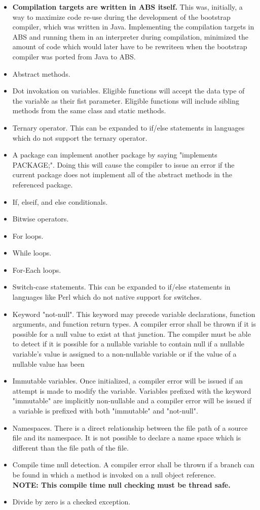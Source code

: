 \documentclass[hidelinks]{article}
\begin{document}
\begin{itemize}
\item \textbf{Compilation targets are written in ABS itself.} This was, initially, a way to maximize code re-use during the development of the bootstrap compiler, which was written in Java. Implementing the compilation targets in ABS and running them in an interpreter during compilation, minimized the amount of code which would later have to be rewriteen when the bootstrap compiler was ported from Java to ABS.
\item Abstract methods.
\item Dot invokation on variables. Eligible functions will accept the data type of the variable as their fist parameter. Eligible functions will include sibling methods from the same class and static methods.
\item Ternary operator. This can be expanded to if/else statements in languages which do not support the ternary operator.
\item A package can implement another package by saying "implements PACKAGE;". Doing this will cause the compiler to issue an error if the current package does not implement all of the abstract methods in the referenced package.
\item If, elseif, and else conditionals.
\item Bitwise operators.
\item For loops.
\item While loops.
\item For-Each loops.
\item Switch-case statements. This can be expanded to if/else statements in languages like Perl which do not native support for switches.
\item Keyword "not-null". This keyword may precede variable declarations, function
   arguments, and function return types. A compiler error shall be thrown if it
   is possible for a null value to exist at that junction. The compiler must be
   able to detect if it is possible for a nullable variable to contain null if
   a nullable variable's value is assigned to a non-nullable variable or if the
   value of a nullable value has been 
\item Immutable variables. Once initialized, a compiler error will be issued if an attempt is made to modify the variable. Variables prefixed with the keyword "immutable" are implicitly non-nullable and a compiler error will be issued if a variable is prefixed with both "immutable" and "not-null".
\item Namespaces. There is a direct relationship between the file path of a source file and its namespace. It is not possible to declare a name space which is different than the file path of the file.
\item Compile time null detection. A compiler error shall be thrown if a branch can be found in which a method is invoked on a null object reference.\\
\textbf{NOTE: This compile time null checking must be thread safe.} 
\item Divide by zero is a checked exception.
\end{itemize}
\end{document}
